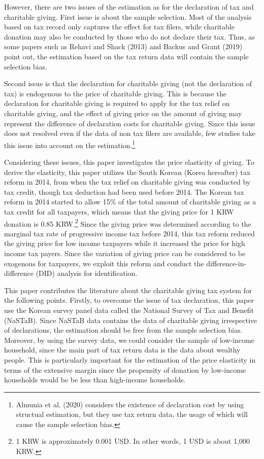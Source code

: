 \documentclass[
  11pt,
  a4paper,
]{article}
\begin{document}
However, there are two issues of the estimation as for the declaration of tax and charitable giving.
First issue is about the sample selection. Most of the analysis based on tax record only captures the effect for tax filers, while charitable donation may also be conducted by those who do not declare their tax. Thus, as some papers such as Rehavi and Shack (2013) and Backus and Grant (2019) point out, the estimation based on the tax return data will contain the sample selection bias.

Second issue is that the declaration for charitable giving (not the declaration of tax) is endogenous to the price of charitable giving. This is because the declaration for charitable giving is required to apply for the tax relief on charitable giving, and the effect of giving price on the amount of giving may represent the difference of declaration costs for charitable giving. Since this issue does not resolved even if the data of non tax filers are available, few studies take this issue into account on the estimation.\footnote{Almunia et al. (2020) considers the existence of declaration cost by using structual estimation, but they use tax return data, the usage of which will cause the sample selection bias.}

Considering these issues, this paper investigates the price elasticity of giving. To derive the elasticity, this paper utilizes the South Korean (Korea hereafter) tax reform in 2014, from when the tax relief on charitable giving was conducted by tax credit, though tax deduction had been used before 2014.
The Korean tax reform in 2014 started to allow 15\% of the total amount of charitable giving as a tax credit for all taxpayers, which means that the giving price for 1 KRW donation is 0.85 KRW.\footnote{1 KRW is approximately 0.001 USD. In other words, 1 USD is about 1,000 KRW.} Since the giving price was determined according to the marginal tax rate of progressive income tax before 2014, this tax reform reduced the giving price for low income taxpayers while it increased the price for high income tax payers. Since the variation of giving price can be considered to be exogenous for taxpayers, we exploit this reform and conduct the difference-in-difference (DID) analysis for identification.

This paper contributes the literature about the charitable giving tax system for the following points. Firstly, to overcome the issue of tax declaration, this paper use the Korean survey panel data called the National Survey of Tax and Benefit (NaSTaB). Since NaSTaB data contains the data of charitable giving irrespective of declarations, the estimation should be free from the sample selection bias. Moreover, by using the survey data, we could consider the sample of low-income household, since the main part of tax return data is the data about wealthy people. This is particularly important for the estimation of the price elasticity in terms of the extensive margin since the propensity of donation by low-income households would be be less than high-income households.
\end{document}
